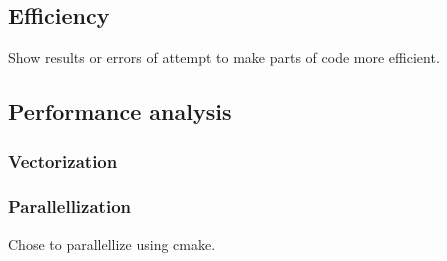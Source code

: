 \subsection{Efficiency}

Show results or errors of attempt to make parts of code more efficient. 

\subsection{Performance analysis}

\subsubsection{Vectorization}

\subsubsection{Parallellization}

Chose to parallellize using cmake.